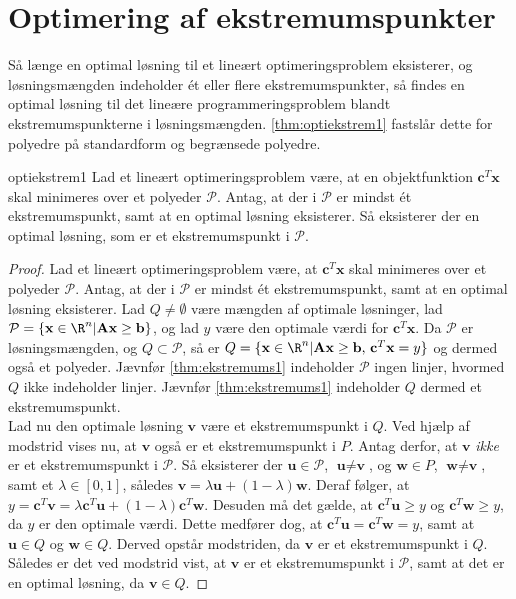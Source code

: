 \section{Optimering af ekstremumspunkter}
%
Så længe en optimal løsning til et lineært optimeringsproblem eksisterer, og løsningsmængden indeholder ét eller flere ekstremumspunkter, så findes en optimal løsning til det lineære programmeringsproblem blandt ekstremumspunkterne i løsningsmængden. 
\ref{thm:optiekstrem1} fastslår dette for polyedre på standardform og begrænsede polyedre. 
%
\begin{thm}{}{optiekstrem1}
Lad et lineært optimeringsproblem være, at en objektfunktion $\textbf{c}^T \textbf{x}$ skal minimeres over et polyeder $\mathcal{P}$. 
Antag, at der i $\mathcal{P}$ er mindst ét ekstremumspunkt, samt at en optimal løsning eksisterer. 
Så eksisterer der en optimal løsning, som er et ekstremumspunkt i $\mathcal{P}$.
\end{thm}
%
%
\begin{proof}
Lad et lineært optimeringsproblem være, at $\textbf{c}^T \textbf{x}$ skal minimeres over et polyeder $\mathcal{P}$. 
Antag, at der i $\mathcal{P}$ er mindst ét ekstremumspunkt, samt at en optimal løsning eksisterer. 
Lad $Q \neq \emptyset $ være mængden af optimale løsninger, lad $\mathcal{P} = \{\textbf{x} \in \R^n | \textbf{A}\textbf{x} \geq \textbf{b} \}$, og lad $y$ være den optimale værdi for $\textbf{c}^T \textbf{x}$. 
Da $\mathcal{P}$ er løsningsmængden, og $Q \subset \mathcal{P}$, så er $Q = \{\textbf{x} \in \R^n | \textbf{A}\textbf{x} \geq \textbf{b} \text{, } \textbf{c}^T \textbf{x} = y \}$ og dermed også et polyeder. 
Jævnfør \ref{thm:ekstremums1} indeholder $\mathcal{P}$ ingen linjer, hvormed $Q$ ikke indeholder linjer. 
Jævnfør \ref{thm:ekstremums1} indeholder $Q$ dermed et ekstremumspunkt. \\
Lad nu den optimale løsning $\textbf{v}$ være et ekstremumspunkt i $Q$. 
Ved hjælp af modstrid vises nu, at $\textbf{v}$ også er et ekstremumspunkt i $P$. 
Antag derfor, at $\textbf{v}$ \textit{ikke} er et ekstremumspunkt i $\mathcal{P}$. 
Så eksisterer der $\textbf{u} \in \mathcal{P}$, $\textbf{u} \neq \textbf{v}$, og $\textbf{w} \in P$, $\textbf{w} \neq \textbf{v}$, samt et $\lambda \in [0,1]$, således $ \textbf{v} = \lambda \textbf{u} + (1 - \lambda) \textbf{w}$. 
Deraf følger, at $y = \textbf{c}^T \textbf{v} =  \lambda \textbf{c}^T \textbf{u} + (1 - \lambda) \textbf{c}^T \textbf{w}$. 
Desuden må det gælde, at $\textbf{c}^T \textbf{u} \geq y$ og $\textbf{c}^T \textbf{w} \geq y$, da $y$ er den optimale værdi. 
Dette medfører dog, at $ \textbf{c}^T \textbf{u} = \textbf{c}^T \textbf{w} = y$, samt at $\textbf{u} \in Q$ og $\textbf{w} \in Q$. 
Derved opstår modstriden, da $\textbf{v}$ er et ekstremumspunkt i $Q$. 
Således er det ved modstrid vist, at $\textbf{v}$ er et ekstremumspunkt i $\mathcal{P}$, samt at det er en optimal løsning, da $\textbf{v} \in Q$. 
\end{proof}\\
